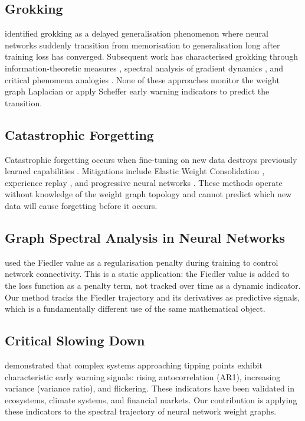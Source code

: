 \documentclass[10pt,twocolumn]{article}
\begin{document}
\subsection{Grokking}

\citet{power2022grokking} identified grokking as a delayed generalisation phenomenon where neural networks suddenly transition from memorisation to generalisation long after training loss has converged. Subsequent work has characterised grokking through information-theoretic measures \citep{clauw2024grokking}, spectral analysis of gradient dynamics \citep{chen2026spectral}, and critical phenomena analogies \citep{wang2026dimensional}. None of these approaches monitor the weight graph Laplacian or apply Scheffer early warning indicators to predict the transition.

\subsection{Catastrophic Forgetting}

Catastrophic forgetting occurs when fine-tuning on new data destroys previously learned capabilities \citep{mccloskey1989catastrophic}. Mitigations include Elastic Weight Consolidation \citep{kirkpatrick2017ewc}, experience replay \citep{rolnick2019replay}, and progressive neural networks \citep{rusu2016progressive}. These methods operate without knowledge of the weight graph topology and cannot predict which new data will cause forgetting before it occurs.

\subsection{Graph Spectral Analysis in Neural Networks}

\citet{tam2020fiedler} used the Fiedler value as a regularisation penalty during training to control network connectivity. This is a static application: the Fiedler value is added to the loss function as a penalty term, not tracked over time as a dynamic indicator. Our method tracks the Fiedler trajectory and its derivatives as predictive signals, which is a fundamentally different use of the same mathematical object.

\subsection{Critical Slowing Down}

\citet{scheffer2009early} demonstrated that complex systems approaching tipping points exhibit characteristic early warning signals: rising autocorrelation (AR1), increasing variance (variance ratio), and flickering. These indicators have been validated in ecosystems, climate systems, and financial markets. Our contribution is applying these indicators to the spectral trajectory of neural network weight graphs.
\end{document}
